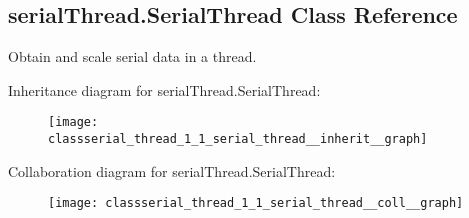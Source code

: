 \hypertarget{classserial_thread_1_1_serial_thread}{\subsection{serial\-Thread.\-Serial\-Thread Class Reference}
\label{classserial_thread_1_1_serial_thread}
}


Obtain and scale serial data in a thread.  




Inheritance diagram for serial\-Thread.\-Serial\-Thread\-:\nopagebreak
\begin{figure}[H]
\begin{center}
\leavevmode
\texttt{[image: classserial\_thread\_1\_1\_serial\_thread\_\_inherit\_\_graph]}
\end{center}
\end{figure}


Collaboration diagram for serial\-Thread.\-Serial\-Thread\-:\nopagebreak
\begin{figure}[H]
\begin{center}
\leavevmode
\texttt{[image: classserial\_thread\_1\_1\_serial\_thread\_\_coll\_\_graph]}
\end{center}
\end{figure}
